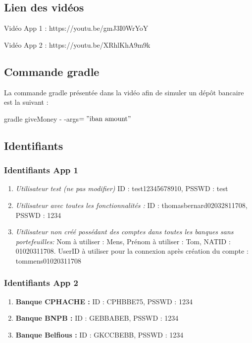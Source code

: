 \documentclass[../rapport.tex]{subfiles}
\begin{document}
	
	\subsection{Lien des vidéos}

	Vidéo App 1 : https://youtu.be/gmJ3I0WrYoY
	
	\medskip

	Vidéo App 2 : https://youtu.be/XRhlKhA9m9k

	\subsection{Commande gradle}
		La commande gradle présentée dans la vidéo afin de simuler
		un dépôt bancaire est la suivant :
		\medskip

		gradle giveMoney - -args$= "\text{iban amount}"$

	\subsection{Identifiants}
		\subsubsection{Identifiants App 1}
			
			\begin{enumerate}
				\item\textit{Utilisateur test (ne pas modifier)} ID : test12345678910, PSSWD : test
				\item\textit{Utilisateur avec toutes les fonctionnalités :} ID : thomasbernard02032811708, PSSWD : 1234
				\item\textit{Utilisateur non créé possédant des comptes dans toutes les banques sans portefeuilles:}
					Nom à utiliser : Mens, Prénom à utiliser : Tom, NATID : 01020311708. UserID à utiliser pour la connexion
					après création du compte : tommens01020311708 
			\end{enumerate}
			

		\subsubsection{Identifiants App 2}
			
			\begin{enumerate}
				\item\textbf{Banque CPHACHE :} ID : CPHBBE75, PSSWD : 1234
				\item\textbf{Banque BNPB :} ID : GEBBABEB, PSSWD : 1234
				\item\textbf{Banque Belfious :} ID : GKCCBEBB, PSSWD : 1234
			\end{enumerate}
\newpage
\end{document}
